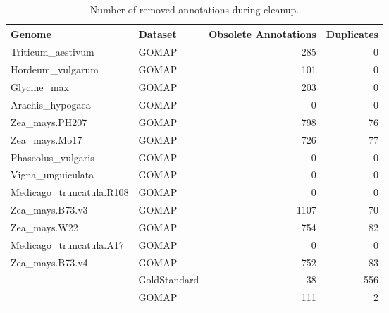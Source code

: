\documentclass[utf8]{frontiersSCNS}
\begin{document}
\begin{table}[t]

\caption{\label{tab:cleanup-table}Number of removed annotations during cleanup.}
\centering
\begin{tabular}{llrr}
\toprule
Genome & Dataset & Obsolete Annotations & Duplicates\\
\midrule
\rowcolor{gray!6}  Triticum\_aestivum & GOMAP & 285 & 0\\
\cmidrule{1-4}
Hordeum\_vulgarum & GOMAP & 101 & 0\\
\cmidrule{1-4}
\rowcolor{gray!6}  Glycine\_max & GOMAP & 203 & 0\\
\cmidrule{1-4}
Arachis\_hypogaea & GOMAP & 0 & 0\\
\cmidrule{1-4}
\rowcolor{gray!6}  Zea\_mays.PH207 & GOMAP & 798 & 76\\
\cmidrule{1-4}
Zea\_mays.Mo17 & GOMAP & 726 & 77\\
\cmidrule{1-4}
\rowcolor{gray!6}  Phaseolus\_vulgaris & GOMAP & 0 & 0\\
\cmidrule{1-4}
Vigna\_unguiculata & GOMAP & 0 & 0\\
\cmidrule{1-4}
\rowcolor{gray!6}  Medicago\_truncatula.R108 & GOMAP & 0 & 0\\
\cmidrule{1-4}
Zea\_mays.B73.v3 & GOMAP & 1107 & 70\\
\cmidrule{1-4}
\rowcolor{gray!6}  Zea\_mays.W22 & GOMAP & 754 & 82\\
\cmidrule{1-4}
Medicago\_truncatula.A17 & GOMAP & 0 & 0\\
\cmidrule{1-4}
\rowcolor{gray!6}  Zea\_mays.B73.v4 & GOMAP & 752 & 83\\
\cmidrule{1-4}
 & GoldStandard & 38 & 556\\

\rowcolor{gray!6}  \multirow{-2}{*}{\raggedright\arraybackslash Oryza\_sativa} & GOMAP & 111 & 2\\
\bottomrule
\end{tabular}
\end{table}
\end{document}
